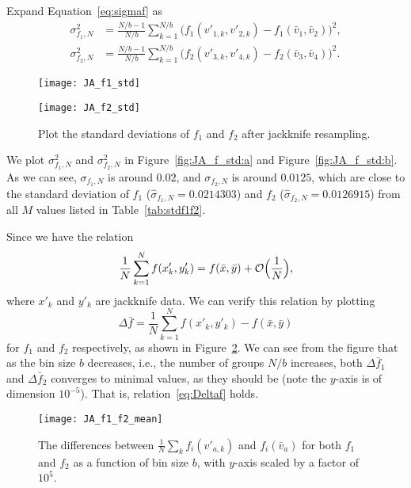 \Answer{}
Expand Equation~\eqref{eq:sigmaf} as
%
\begin{align}
    \sigma^2_{f_1,N} & = \frac{ N/b - 1 }{ N/b }
    \sum_{k=1}^{N/b} \bigl( f_1(v'_{1,k}, v'_{2,k}) - f_1(\bar{v}_1, \bar{v}_2) \bigr)^2, \\
    \sigma^2_{f_2,N} & = \frac{ N/b - 1 }{ N/b }
    \sum_{k=1}^{N/b} \bigl( f_2(v'_{3,k}, v'_{4,k}) - f_2(\bar{v}_3, \bar{v}_4) \bigr)^2.
\end{align}
%
\begin{figure}[H]
    \centering
    \begin{minipage}[t]{0.8\linewidth}
        \centering
        \texttt{[image: JA\_f1\_std]}
        \label{fig:JA_f_std:a}
    \end{minipage}
    \hfill
    \begin{minipage}[t]{0.8\linewidth}
        \centering
        \texttt{[image: JA\_f2\_std]}
        \label{fig:JA_f_std:b}
    \end{minipage}
    \caption{Plot the standard deviations of \(f_1\) and \(f_2\) after jackknife resampling.}
    \label{fig:JA_f_std}
\end{figure}
%
We plot \(\sigma^2_{f_1,N}\) and \(\sigma^2_{f_2,N}\) in Figure~\ref{fig:JA_f_std:a}
and Figure~\ref{fig:JA_f_std:b}.
As we can see, \(\sigma_{f_1,N}\) is around \(0.02\),
and \(\sigma_{f_2,N}\) is around \(0.0125\), which are close to the standard deviation
of \(f_1\) (\(\hat{\sigma}_{f_1,N} = 0.0214303\)) and
\(f_2\) (\(\hat{\sigma}_{f_2,N} = 0.0126915\))
from all \(M\) values listed in Table~\ref{tab:stdf1f2}.

Since we have the relation
%
\begin{equation}\label{eq:Deltaf}
    \frac{1}{N} \sum_{k=1}^N f(x'_k, y'_k) = f(\bar{x}, \bar{y}) +
    \mathcal{O}\Bigl(\frac{1}{N}\Bigr),
\end{equation}
%
where \(x'_k\) and \(y'_k\) are jackknife data.
We can verify this relation by plotting
%
\begin{equation}
    \Delta \bar{f} = \frac{1}{N} \sum_{k=1}^N f(x'_k, y'_k) - f(\bar{x}, \bar{y})
\end{equation}
%
for \(f_1\) and \(f_2\) respectively, as shown in Figure~\ref{fig:JA_f1_f2_mean}.
We can see from the figure that as the bin size \(b\) decreases, i.e., the number
of groups \(N / b\) increases, both \(\Delta \bar{f}_1\) and \(\Delta \bar{f}_2\)
converges to minimal values, as they should be (note the \(y\)-axis is of dimension
\(10^{-5}\)). That is, relation~\eqref{eq:Deltaf} holds.
%
\begin{figure}[H]
    \centering
    \texttt{[image: JA\_f1\_f2\_mean]}
    \caption{The differences between \(\frac{1}{N} \sum_{k} f_i(v'_{a,k})\)
    and \(f_i(\bar{v}_a)\) for both \(f_1\) and \(f_2\) as a function of bin size
    \(b\), with \(y\)-axis scaled by a factor of \(10^5\).}
    \label{fig:JA_f1_f2_mean}
\end{figure}
